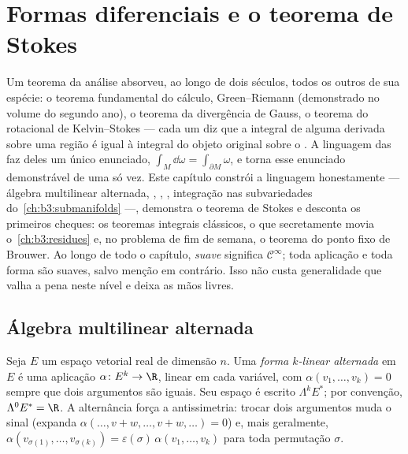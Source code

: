 \chapter{Formas diferenciais e o teorema de Stokes}\label{ch:b3:forms}

Um teorema da análise absorveu, ao longo de dois séculos, todos os
outros de sua espécie: o teorema fundamental do cálculo, Green--Riemann
(demonstrado no volume do segundo ano), o teorema da divergência de
Gauss, o teorema do rotacional de Kelvin--Stokes --- cada um diz que a
integral de alguma derivada sobre uma região é igual à integral do
objeto original sobre o . A linguagem das \emph{} faz deles um único enunciado, $\int_M\dd\omega = \int_{\partial M}\omega$, e torna esse enunciado
demonstrável de uma só vez. Este capítulo constrói a linguagem
honestamente --- álgebra multilinear alternada, ,
, , integração nas subvariedades do~\cref{ch:b3:submanifolds} ---, demonstra o teorema de Stokes e desconta os primeiros
cheques: os teoremas integrais clássicos, o  que
secretamente movia o~\cref{ch:b3:residues} e, no problema de fim de semana, o
teorema do ponto fixo de Brouwer. Ao longo de todo o capítulo,
\emph{suave} significa $\mathcal
C^\infty$; toda aplicação e toda forma são suaves,
salvo menção em contrário. Isso não custa generalidade que valha a pena
neste nível e deixa as mãos livres.

\section{Álgebra multilinear alternada}

\begin{definition}\label{def:b3:forms:alternating}
Seja $E$ um espaço vetorial real de dimensão $n$. Uma \emph{forma
$k$-linear alternada} em $E$ é uma aplicação
$\alpha\colon E^k \to \R$, linear em cada variável, com $\alpha(v_1, \dots, v_k) = 0$ sempre que dois argumentos são
iguais. Seu espaço é escrito $\Lambda^k E^*$; por convenção, $\Lambda^0E^* = \R$. A alternância
força a antissimetria: trocar dois argumentos muda o sinal (expanda
$\alpha(\dots, v + w, \dots, v + w, \dots) = 0$) e, mais geralmente, $\alpha(v_{\sigma(1)}, \dots, v_{\sigma(k)}) =
\varepsilon(\sigma)\,\alpha(v_1, \dots, v_k)$ para toda permutação $\sigma$.
\end{definition}

